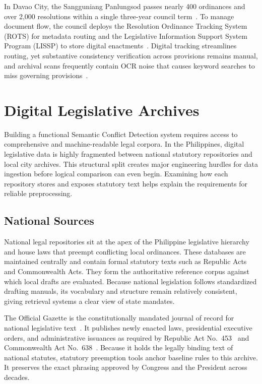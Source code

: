    In Davao City, the Sangguniang Panlungsod passes nearly 400 ordinances and over 2,000 resolutions within a single three-year council term~\cite{patumbon2025landmark}. To manage document flow, the council deploys the Resolution Ordinance Tracking System (ROTS) for metadata routing and the Legislative Information Support System Program (LISSP) to store digital enactments~\cite{citygov2025lissp}. Digital tracking streamlines routing, yet substantive consistency verification across provisions remains manual, and archival scans frequently contain OCR noise that causes keyword searches to miss governing provisions~\cite{lopresti2008optical}.

\section{Digital Legislative Archives}
Building a functional Semantic Conflict Detection system requires access to comprehensive and machine-readable legal corpora. In the Philippines, digital legislative data is highly fragmented between national statutory repositories and local city archives. This structural split creates major engineering hurdles for data ingestion before logical comparison can even begin. Examining how each repository stores and exposes statutory text helps explain the requirements for reliable preprocessing.

   \subsection{National Sources}
   National legal repositories sit at the apex of the Philippine legislative hierarchy and house laws that preempt conflicting local ordinances. These databases are maintained centrally and contain formal statutory texts such as Republic Acts and Commonwealth Acts. They form the authoritative reference corpus against which local drafts are evaluated. Because national legislation follows standardized drafting manuals, its vocabulary and structure remain relatively consistent, giving retrieval systems a clear view of state mandates.

   The Official Gazette is the constitutionally mandated journal of record for national legislative text~\cite{officialgazette}. It publishes newly enacted laws, presidential executive orders, and administrative issuances as required by Republic Act No.~453~\cite{act453_1902} and Commonwealth Act No.~638~\cite{ca638_1941}. Because it holds the legally binding text of national statutes, statutory preemption tools anchor baseline rules to this archive. It preserves the exact phrasing approved by Congress and the President across decades.

